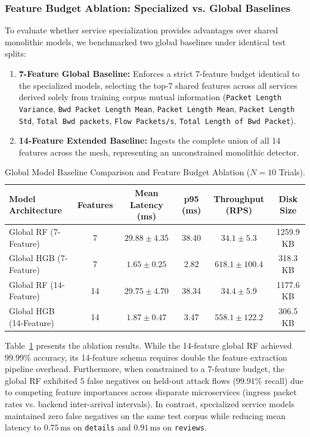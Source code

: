 \subsubsection{Feature Budget Ablation: Specialized vs. Global Baselines}
To evaluate whether service specialization provides advantages over shared monolithic models, we benchmarked two global baselines under identical test splits:
\begin{enumerate}
    \item \textbf{7-Feature Global Baseline:} Enforces a strict 7-feature budget identical to the specialized models, selecting the top-7 shared features across all services derived solely from training corpus mutual information (\texttt{Packet Length Variance}, \texttt{Bwd Packet Length Mean}, \texttt{Packet Length Mean}, \texttt{Packet Length Std}, \texttt{Total Bwd packets}, \texttt{Flow Packets/s}, \texttt{Total Length of Bwd Packet}).
    \item \textbf{14-Feature Extended Baseline:} Ingests the complete union of all 14 features across the mesh, representing an unconstrained monolithic detector.
\end{enumerate}

\begin{table}[!t]
\renewcommand{\arraystretch}{1.2}
\caption{Global Model Baseline Comparison and Feature Budget Ablation ($N=10$ Trials).}
\label{tab:scenario4_global_ablation}
\centering
\footnotesize
\setlength{\tabcolsep}{4.5pt}
\begin{tabular}{@{}l c c c c c@{}}
\toprule
\textbf{Model Architecture} & \textbf{Features} & \textbf{Mean Latency (ms)} & \textbf{p95 (ms)} & \textbf{Throughput (RPS)} & \textbf{Disk Size} \\
\midrule
Global RF (7-Feature)       & 7  & $29.88 \pm 4.35$ & 38.40 & $34.1 \pm 5.3$   & 1259.9 KB \\
Global HGB (7-Feature)      & 7  & $1.65 \pm 0.25$  & 2.82  & $618.1 \pm 100.4$ & 318.3 KB \\
\midrule
Global RF (14-Feature)      & 14 & $29.75 \pm 4.70$ & 38.34 & $34.4 \pm 5.9$   & 1177.6 KB \\
Global HGB (14-Feature)     & 14 & $1.87 \pm 0.47$  & 3.47  & $558.1 \pm 122.2$ & 306.5 KB \\
\bottomrule
\end{tabular}
\end{table}

Table~\ref{tab:scenario4_global_ablation} presents the ablation results. While the 14-feature global RF achieved $99.99\%$ accuracy, its 14-feature schema requires double the feature extraction pipeline overhead. Furthermore, when constrained to a 7-feature budget, the global RF exhibited $5$ false negatives on held-out attack flows ($99.91\%$ recall) due to competing feature importances across disparate microservices (ingress packet rates vs. backend inter-arrival intervals). In contrast, specialized service models maintained zero false negatives on the same test corpus while reducing mean latency to $0.75\,\text{ms}$ on \texttt{details} and $0.91\,\text{ms}$ on \texttt{reviews}.


